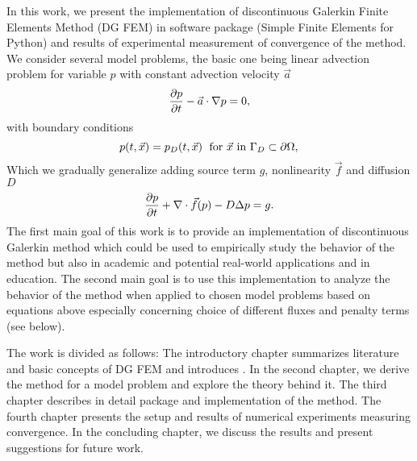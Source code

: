 In this work, we present the implementation of discontinuous Galerkin Finite 
Elements Method (DG FEM) in software package \sfepy{} (Simple Finite Elements 
for 
Python) and results of experimental measurement of convergence of the method. 
We consider several model problems, the basic one being linear 
advection problem for variable $p$ with constant advection velocity $\vec{a}$
$$
\frac{\partial p}{\partial t} - \vec{a}\cdot\nabla p = 0,
$$
with boundary conditions
$$
p(t, \vec{x}) = p_D(t, \vec{x}) \; \text{ for } \vec{x} \text{ in } \Gamma_D 
\subset 
\partial\Omega, \\
$$
Which we gradually generalize adding source term $g$, nonlinearity $\vec{f}$ 
and diffusion $D$
\begin{equation*}
\frac{\partial p}{\partial t} + \nabla\cdot \vec{f}(p) - D\Delta p = g.
\end{equation*}
The first main goal of this work is to provide an implementation of 
discontinuous Galerkin 
method which could be used to empirically study the behavior of the method but 
also in academic and potential real-world applications and in education. The 
second main goal is to use this implementation to analyze the behavior of the 
method when applied to chosen model problems based on equations above 
especially concerning choice of different fluxes and penalty terms (see below).

The work is divided as follows: The introductory chapter summarizes literature 
and basic concepts of DG FEM and introduces \sfepy{}. In the second chapter, 
we derive the method for a model problem and explore the theory behind it. The 
third chapter describes in detail \sfepy{} package and implementation of the 
method. The fourth chapter presents the setup and results of numerical 
experiments measuring convergence. In the concluding chapter, we discuss the 
results and present suggestions for future work.

